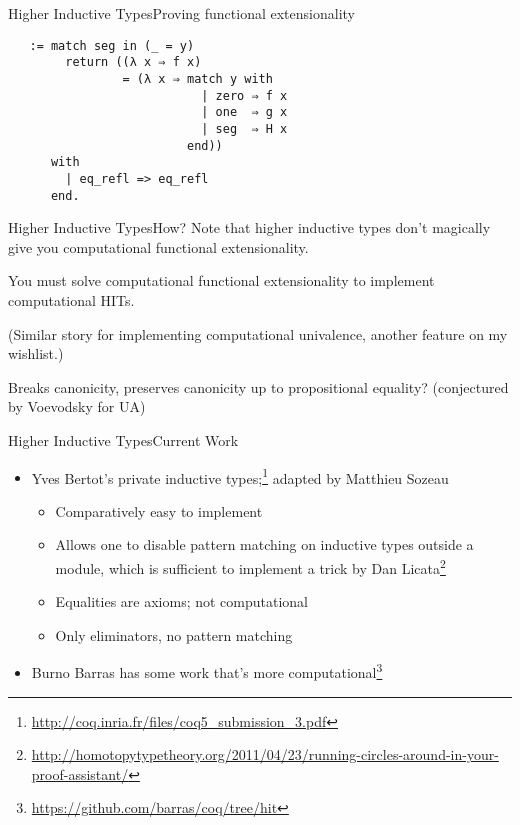 \documentclass{beamer}
\begin{document}
\begin{frame}[fragile]{Higher Inductive Types}{Proving functional extensionality}
  \Large
\begin{verbatim}
   := match seg in (_ = y)
        return ((λ x ⇒ f x)
                = (λ x ⇒ match y with
                           | zero ⇒ f x
                           | one  ⇒ g x
                           | seg  ⇒ H x
                         end))
      with
        | eq_refl => eq_refl
      end.
\end{verbatim}
\end{frame}

\begin{frame}{Higher Inductive Types}{How?}
  \Large
  Note that higher inductive types don't magically give you computational functional extensionality. \pause
  
  You must solve computational functional extensionality to implement computational HITs. \pause
  
  (Similar story for implementing computational univalence, another feature on my wishlist.) \pause
  
  Breaks canonicity, \pause preserves canonicity up to propositional equality? (conjectured by Voevodsky for UA)
\end{frame}

\begin{frame}{Higher Inductive Types}{Current Work}
  \Large
  \begin{itemize}
    \item Yves Bertot's private inductive types;\footnote{\url{http://coq.inria.fr/files/coq5\_submission_3.pdf}} adapted by Matthieu Sozeau \pause
      \begin{itemize} \large
        \item Comparatively easy to implement \pause
        \item Allows one to disable pattern matching on inductive types outside a module, which is sufficient to implement a trick by Dan Licata\footnote<3->{\url{http://homotopytypetheory.org/2011/04/23/running-circles-around-in-your-proof-assistant/}} \pause
        \item Equalities are axioms; not computational \pause
        \item Only eliminators, no pattern matching \pause
      \end{itemize}
    \item Burno Barras has some work that's more computational\footnote<6->{\url{https://github.com/barras/coq/tree/hit}}
  \end{itemize}
\end{frame}
\end{document}
